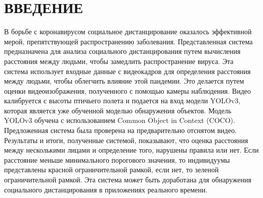 \chapter*{ВВЕДЕНИЕ}

В борьбе с коронавирусом социальное дистанцирование оказалось эффективной мерой, препятствующей распространению заболевания. Представленная система предназначена для анализа социального дистанцирования путем вычисления расстояния между людьми, чтобы замедлить распространение вируса. Эта система использует входные данные с видеокадров для определения расстояния между людьми, чтобы облегчить влияние этой пандемии. Это делается путем оценки видеоизображения, полученного с помощью камеры наблюдения. Видео калибруется с высоты птичьего полета и подается на вход модели YOLOv3, которая является уже обученной моделью обнаружения объектов. Модель YOLOv3 обучена с использованием Common Object in Context (COCO). Предложенная система была проверена на предварительно отснятом видео. Результаты и итоги, полученные системой, показывают, что оценка расстояния между несколькими лицами и определение того, нарушены правила или нет. Если расстояние меньше минимального порогового значения, то индивидуумы представлены красной ограничительной рамкой, если нет, то зеленой ограничительной рамкой. Эта система может быть доработана для обнаружения социального дистанцирования в приложениях реального времени.

\newpage